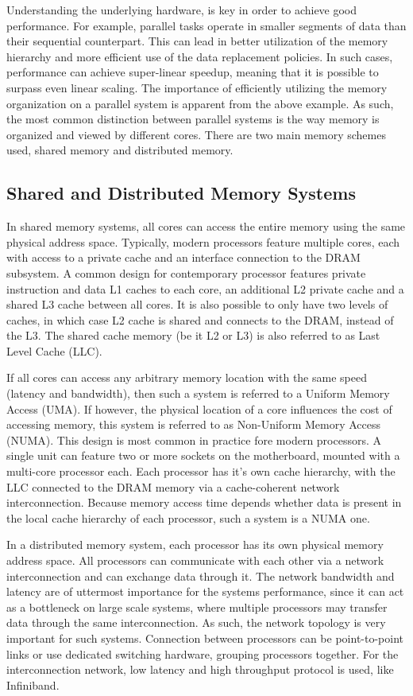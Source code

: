 Understanding the underlying hardware, is key in order to achieve good performance.  For
example, parallel tasks operate in smaller segments of data than their sequential
counterpart.  This can lead in better utilization of the memory hierarchy and more
efficient use of the data replacement policies.  In such cases, performance can achieve
super-linear speedup, meaning that it is possible to surpass even linear scaling.  The
importance of efficiently utilizing the memory organization on a parallel system is
apparent from the above example.  As such, the most common distinction between parallel
systems is the way memory is organized and viewed by different cores.  There are two main
memory schemes used, shared memory and distributed memory.  

\subsection{Shared and Distributed Memory Systems}
In shared memory systems, all cores can access the entire memory using the same physical
address space.  Typically, modern processors feature multiple cores, each with access to a
private cache and an interface connection to the DRAM subsystem.  A common design for
contemporary processor features private instruction and data L1 caches to each core, an
additional L2 private cache and a shared L3 cache between all cores.  It is also possible
to only have two levels of caches, in which case L2 cache is shared and connects to the
DRAM, instead of the L3.  The shared cache memory (be it L2 or L3) is also referred to as
Last Level Cache (LLC). 

If all cores can access any arbitrary memory location with the same speed (latency and
bandwidth), then such a system is referred to a Uniform Memory Access (UMA).  If however,
the physical location of a core influences the cost of accessing memory, this system is
referred to as Non-Uniform Memory Access (NUMA).  This design is most common in practice
fore modern processors.  A single unit can feature two or more sockets on the motherboard,
mounted with a multi-core processor each.  Each processor has it's own cache hierarchy,
with the LLC connected to the DRAM memory via a cache-coherent network interconnection.
Because memory access time depends whether data is present in the local cache hierarchy of
each processor, such a system is a NUMA one.        

In a distributed memory system, each processor has its own physical memory address space.
All processors can communicate with each other via a network interconnection and can
exchange data through it.  The network bandwidth and latency are of uttermost importance
for the systems performance, since it can act as a bottleneck on large scale systems,
where multiple processors may transfer data through the same interconnection.  As such,
the network topology is very important for such systems.  Connection between processors
can be point-to-point links or use dedicated switching hardware, grouping processors
together.  For the interconnection network, low latency and high throughput protocol is
used, like Infiniband. 

